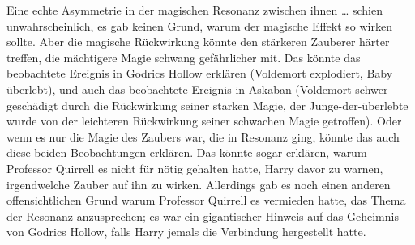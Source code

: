 Eine echte Asymmetrie in der magischen Resonanz zwischen ihnen … schien unwahrscheinlich, es gab keinen Grund, warum der magische Effekt so wirken sollte. Aber die magische Rückwirkung könnte den stärkeren Zauberer härter treffen, die mächtigere Magie schwang gefährlicher mit. Das könnte das beobachtete Ereignis in Godrics Hollow erklären (Voldemort explodiert, Baby überlebt), und auch das beobachtete Ereignis in Askaban (Voldemort schwer geschädigt durch die Rückwirkung seiner starken Magie, der Junge-der-überlebte wurde von der leichteren Rückwirkung seiner schwachen Magie getroffen). Oder wenn es nur die Magie des Zaubers war, die in Resonanz ging, könnte das auch diese beiden Beobachtungen erklären. Das könnte sogar erklären, warum Professor Quirrell es nicht für nötig gehalten hatte, Harry davor zu warnen, irgendwelche Zauber auf ihn zu wirken. Allerdings gab es noch einen anderen offensichtlichen Grund warum Professor Quirrell es vermieden hatte, das Thema der Resonanz anzusprechen; es war ein gigantischer Hinweis auf das Geheimnis von Godrics Hollow, falls Harry jemals die Verbindung hergestellt hatte.

